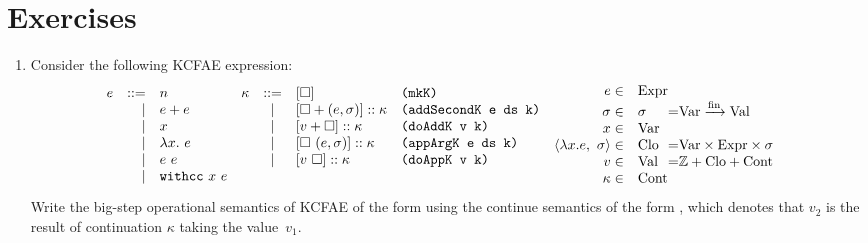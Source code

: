 \section{Exercises}

\begin{enumerate}
\item Consider the following KCFAE expression:
\[
\!\!\!\!\!\!\!\!
\begin{array}{l@{}l@{}l}
\begin{array}{rrl}
  e & ::= & n\\
        & | & e + e\\
        & | & x\\
        & | & \lambda x.\ e\\
        & | & e\ e\\
        & | & \mbox{\texttt{withcc}}\ x\ e\\
\end{array}
&
\begin{array}{rcll}
  \kappa & ::= & {[\square]} &\mbox{\code{(mkK)}}\\
        & | & {[\square + (e, \sigma)]} :: \kappa &\mbox{\code{(addSecondK e ds k)}}\\
        & | & {[v + \square]} :: \kappa &\mbox{\code{(doAddK v k)}}\\
        & | & {[\square\ (e, \sigma)]} :: \kappa &\mbox{\code{(appArgK e ds k)}}\\
        & | & {[v\ \square]} :: \kappa &\mbox{\code{(doAppK v k)}}\\ \\
\end{array}
&
\begin{array}{rl@{}c@{}l}
  e \in& \mbox{Expr}&&\\
  \sigma \in& \sigma &=& \finmap{\mbox{Var}}{\mbox{Val}}\\
  x \in& \mbox{Var} &&\\
\langle\lambda x. e,\ \sigma\rangle \in& \mbox{Clo} &=& \mbox{Var} \times \mbox{Expr} \times \sigma\\
  v \in& \mbox{Val} &=& \mathbb{Z} + \mbox{Clo} + \mbox{Cont}\\
  \kappa \in& \mbox{Cont} &&\\
\end{array}
\end{array}
\]
Write the big-step operational semantics of KCFAE
of the form 
using the continue semantics of the form ,
which denotes that $v_2$ is the result of continuation $\kappa$ taking the value~$v_1$.


\end{enumerate}
